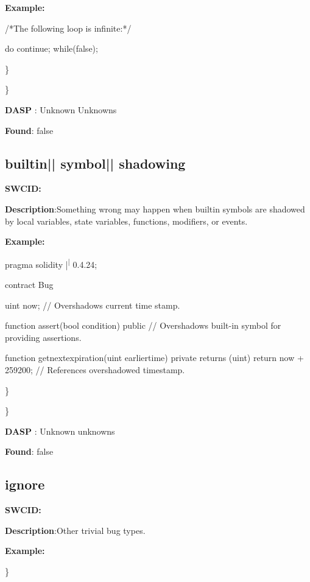 \documentclass{article}
\begin{document}
\textbf{Example:} 
\begin{ffcode} 

/*The following loop is infinite:*/ 

do {
    continue;
} while(false);

\end{ffcode} 
\} 

\} 

\textbf{DASP} : Unknown Unknowns

\textbf{Found}: false

\subsection{builtin{|\textunderscore| }symbol{|\textunderscore| }shadowing} 
\textbf{SWC{\textunderscore }ID:} 

\textbf{Description}:Something wrong may happen when built{\textendash}in symbols are shadowed by local variables, state variables, functions, modifiers, or events.


\textbf{Example:} 
\begin{ffcode} 

pragma solidity |\textsuperscript| 0.4.24;

contract Bug {
    uint now; // Overshadows current time stamp.

    function assert(bool condition) public {
        // Overshadows built-in symbol for providing assertions.
    }

    function get\textunderscore next\textunderscore expiration(uint earlier\textunderscore time) private returns (uint) {
        return now + 259200; // References overshadowed timestamp.
    }
}

\end{ffcode} 
\} 

\} 

\textbf{DASP} : Unknown unknowns

\textbf{Found}: false

\subsection{ignore} 
\textbf{SWC{\textunderscore }ID:} 

\textbf{Description}:Other trivial bug types.


\textbf{Example:} 
\begin{ffcode} 


\end{ffcode} 
\} 
\end{document}
